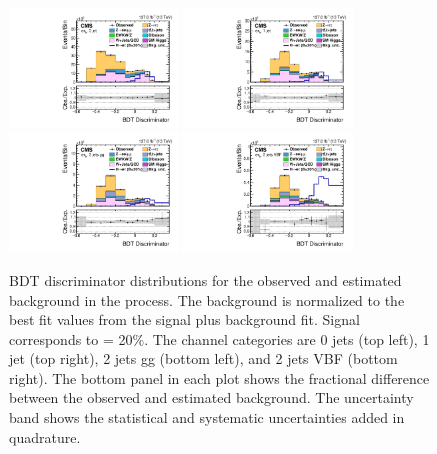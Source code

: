 \begin{figure}[htbp!]
  \centering
  \includegraphics[width=0.4\textwidth]{plots/chapter9/BDT/etau/0jet.pdf}
  \includegraphics[width=0.4\textwidth]{plots/chapter9/BDT/etau/1jet.pdf} \\
  \includegraphics[width=0.4\textwidth]{plots/chapter9/BDT/etau/2jet_gg.pdf}
  \includegraphics[width=0.4\textwidth]{plots/chapter9/BDT/etau/2jet_vbf.pdf} \\
  \caption{BDT discriminator distributions for the observed and estimated background in the \ehad process. The background is normalized to the best fit values from the signal plus background fit. Signal corresponds to \BHet = 20\%. The \ehad channel categories are 0 jets (top left), 1 jet (top right), 2 jets gg (bottom left), and 2 jets VBF (bottom right). The bottom panel in each plot shows the fractional difference between the observed and estimated background. The uncertainty band shows the statistical and systematic uncertainties added in quadrature.}
  \label{fig:bdt_ehad}
\end{figure}

